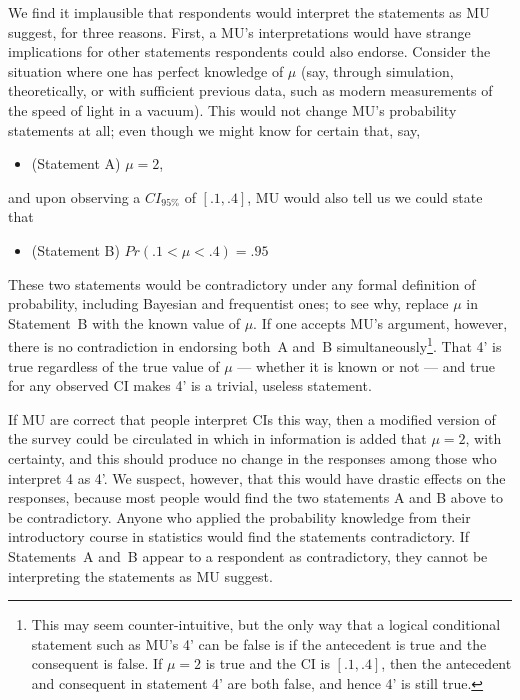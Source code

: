 \documentclass[jou,a4paper,floatsintext,draftfirst]{apa6}\usepackage[]{graphicx}\usepackage[]{color}
\begin{document}
We find it implausible that respondents would interpret the statements as MU suggest, for three reasons. First, a MU's interpretations would have strange implications for other statements respondents could also endorse. Consider the situation where one has perfect knowledge of $\mu$ (say, through simulation, theoretically, or with sufficient previous data, such as modern measurements of the speed of light in a vacuum). This would not change MU's probability statements at all; even though we might know for certain that, say, 
\begin{itemize}
\item (Statement A)  $\mu=2$,
\end{itemize}
and upon observing a $CI_{95\%}$ of $[.1, .4]$, MU would also tell us we could state that
\begin{itemize}
\item (Statement B) $Pr(.1<\mu<.4) = .95$
\end{itemize}
These two statements would be contradictory under any formal definition of probability, including Bayesian and frequentist ones; to see why, replace $\mu$ in Statement~B with the known value of $\mu$. If one accepts MU's argument, however, there is no contradiction in endorsing both~A and~B simultaneously\footnote{This may seem counter-intuitive, but the only way that a logical conditional statement such as MU's 4' can be false is if the antecedent is true and the consequent is false. If $\mu=2$ is true and the CI is $[.1, .4]$, then the antecedent and consequent in statement 4' are both false, and hence 4' is still true.}. That 4' is true regardless of the true value of $\mu$ --- whether it is known or not --- and true for any observed CI makes 4' is a trivial, useless statement.

If MU are correct that people interpret CIs this way, then a modified version of the survey could be circulated in which in information is added that $\mu=2$, with certainty, and this should produce no change in the responses among those who interpret 4 as 4'. We suspect, however, that this would have drastic effects on the responses, because most people would find the two statements A and B above to be contradictory. Anyone who applied the probability knowledge from their introductory course in statistics would find the statements contradictory. If Statements~A and~B appear to a respondent as contradictory, they cannot be interpreting the statements as MU suggest. 
\end{document}

